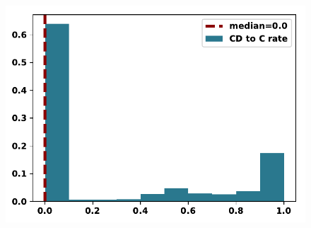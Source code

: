 \documentclass{article}
\begin{document}
\begin{figure}[!htbp]
    \centering
    \includegraphics[width=.5\textwidth]{../images/cd_to_c_probend.pdf}
\end{figure}
\end{document}
